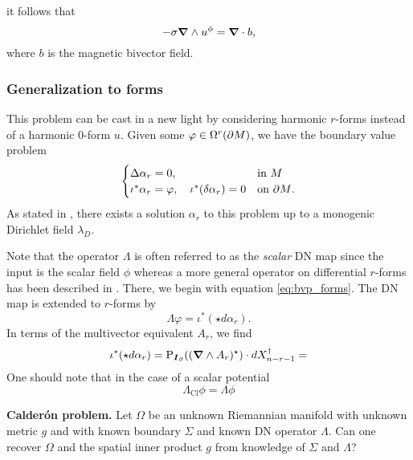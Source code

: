 it follows that 
\begin{equation}
-\sigma \boldsymbol{\nabla} \wedge u^\phi = \boldsymbol{\nabla} \cdot b,
\end{equation}
where $b$ is the magnetic bivector field.


\subsubsection{Generalization to forms}

This problem can be cast in a new light by considering harmonic $r$-forms instead of a harmonic 0-form $u$. 
Given some $\varphi \in \Omega^r({\partial M})$, we have the boundary value problem
\begin{equation}
\label{eq:bvp_forms}
\begin{cases} 
\Delta \alpha_r = 0, & \textrm{in $M$}\\
\iota^* \alpha_r = \varphi, \quad \iota^*(\delta \alpha_r) = 0 & \textrm{on ${\partial M}$}.
\end{cases}
\end{equation}
As stated in \cite{belishev_dirichlet_2008}, there exists a solution $\alpha_r$ to this problem up to a monogenic Dirichlet field $\lambda_D$.

Note that the operator $\Lambda$ is often referred to as the \emph{scalar} DN map since the input is the scalar field $\phi$ whereas a more general operator on differential $r$-forms has been described in \cite{belishev_dirichlet_2008,sharafutdinov_complete_2013}. There, we begin with equation \cref{eq:bvp_forms}. The DN map is extended to $r$-forms by
\begin{equation}
\Lambda \varphi = \iota^* (\star d \alpha_r).
\end{equation}
In terms of the multivector equivalent $A_r$, we find
\begin{equation}
\iota^*(\star d \alpha_r) = \operatorname{P}_{\boldsymbol{I}_\partial} ((\boldsymbol{\nabla} \wedge A_r)^\star )\cdot dX_{n-r-1}^\dagger = 
\end{equation}
 One should note that in the case of a scalar potential 
\begin{equation}
\Lambda_\textrm{Cl} \phi = \Lambda \phi
\end{equation}

\vspace*{5pt}
\noindent\textbf{Calder\'on problem.} Let $\Omega$ be an unknown Riemannian manifold with unknown metric $g$ and with known boundary $\Sigma$ and known DN operator $\Lambda$. Can one recover $\Omega$ and the spatial inner product $g$ from knowledge of $\Sigma$ and $\Lambda$?
\vspace*{5pt}

